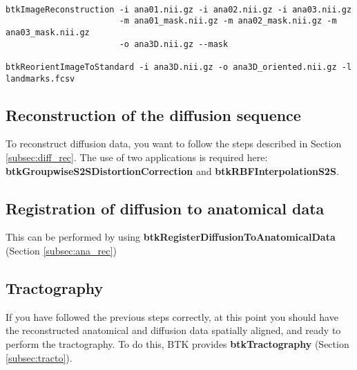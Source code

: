 \begin{verbatim}
 
btkImageReconstruction -i ana01.nii.gz -i ana02.nii.gz -i ana03.nii.gz 
                       -m ana01_mask.nii.gz -m ana02_mask.nii.gz -m ana03_mask.nii.gz
                       -o ana3D.nii.gz --mask

btkReorientImageToStandard -i ana3D.nii.gz -o ana3D_oriented.nii.gz -l landmarks.fcsv

\end{verbatim}



\subsection{Reconstruction of the diffusion sequence}
To reconstruct diffusion data, you want to follow the steps described in
Section \ref{subsec:diff_rec}. The use of two applications is required here:
\textbf{btkGroupwiseS2SDistortionCorrection} and
\textbf{btkRBFInterpolationS2S}.

\subsection{Registration of diffusion to anatomical data}
This can be performed by using \textbf{btkRegisterDiffusionToAnatomicalData}
(Section \ref{subsec:ana_rec})

\subsection{Tractography}
If you have followed the previous steps correctly, at this point you should
have the reconstructed anatomical and diffusion data spatially aligned, and
ready to perform the tractography. To do this, BTK provides
\textbf{btkTractography} (Section \ref{subsec:tracto}).
